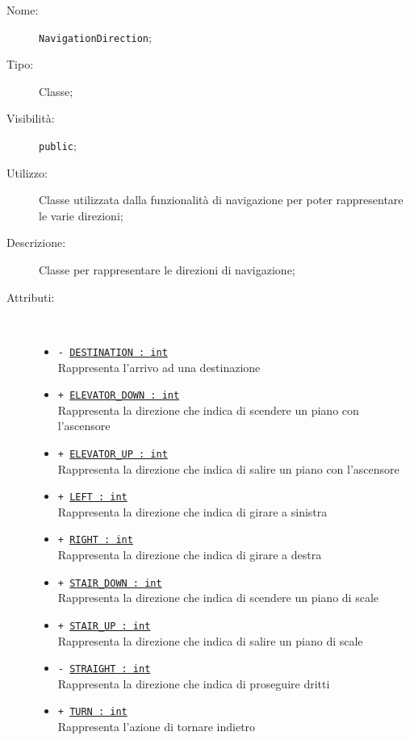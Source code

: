 \documentclass[../DefinizioneDiProdotto.tex]{subfiles}
\begin{document}
\begin{description}
	\item[Nome:] \texttt{NavigationDirection};
	\item[Tipo:] Classe;
	\item[Visibilità:] \texttt{public};
	\item[Utilizzo:] Classe utilizzata dalla funzionalità di navigazione per poter rappresentare le varie direzioni;
	\item[Descrizione:] Classe per rappresentare le direzioni di navigazione;
	\item[Attributi:] \
	\begin{itemize}
		\item \texttt{- \underline{DESTINATION : int}}\\
		Rappresenta l'arrivo ad una destinazione
		
		\item \texttt{+ \underline{ELEVATOR\_DOWN : int}}\\
		Rappresenta la direzione che indica di scendere un piano con l'ascensore
		
		\item \texttt{+ \underline{ELEVATOR\_UP : int}}\\
		Rappresenta la direzione che indica di salire un piano con l'ascensore
		
		\item \texttt{+ \underline{LEFT : int}}\\
		Rappresenta la direzione che indica di girare a sinistra
		
		\item \texttt{+ \underline{RIGHT : int}}\\
		Rappresenta la direzione che indica di girare a destra
		
		\item \texttt{+ \underline{STAIR\_DOWN : int}}\\
		Rappresenta la direzione che indica di scendere un piano di scale
		
		\item \texttt{+ \underline{STAIR\_UP : int}}\\
		Rappresenta la direzione che indica di salire un piano di scale
		
		\item \texttt{- \underline{STRAIGHT : int}}\\
		Rappresenta la direzione che indica di proseguire dritti
		
		\item \texttt{+ \underline{TURN : int}}\\
		Rappresenta l'azione di tornare indietro
		
	\end{itemize}
\end{description}
\end{document}
